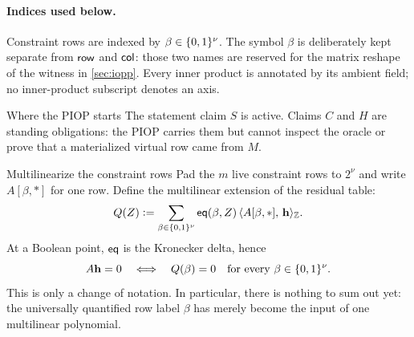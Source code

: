 \paragraph{Indices used below.}
Constraint rows are indexed by
$\beta\in\{0,1\}^{\nu}$.  The symbol $\beta$ is deliberately kept separate from
$\mathsf{row}$ and $\mathsf{col}$: those two names are reserved for the matrix reshape of
the witness in \cref{sec:iopp}.  Every inner product is annotated by its
ambient field; no inner-product subscript denotes an axis.

\clgreset
\renewcommand{\clgboardtitle}{Open claims}

\begin{step*}{Where the PIOP starts}{%
}
The statement claim $S$ is active.  Claims $C$ and $H$ are standing
obligations: the PIOP carries them but cannot inspect the oracle or prove that a
materialized virtual row came from $M$.
\end{step*}

\begin{step}{Multilinearize the constraint rows}{%
}\label{step:mlin}
Pad the $m$ live constraint rows to $2^{\nu}$ and write $A[\beta,*]$ for one
row.  Define the multilinear extension of the residual table:
\[
  Q(Z)
  \vcentcolon=
  \sum_{\beta\in\{0,1\}^{\nu}}
     \mathsf{eq}(\beta,Z)\,\langle A[\beta,*],\, \mathbf{h}\rangle_{\mathbb{Z}}.
\]
At a Boolean point, $\mathsf{eq}$ is the Kronecker delta, hence
\[
  A\mathbf{h}=0
  \quad\Longleftrightarrow\quad
  Q(\beta)=0\quad\text{for every }\beta\in\{0,1\}^{\nu}.
\]
This is only a change of notation.  In particular, there is nothing to sum out
yet: the universally quantified row label $\beta$ has merely become the input
of one multilinear polynomial.

\end{step}

